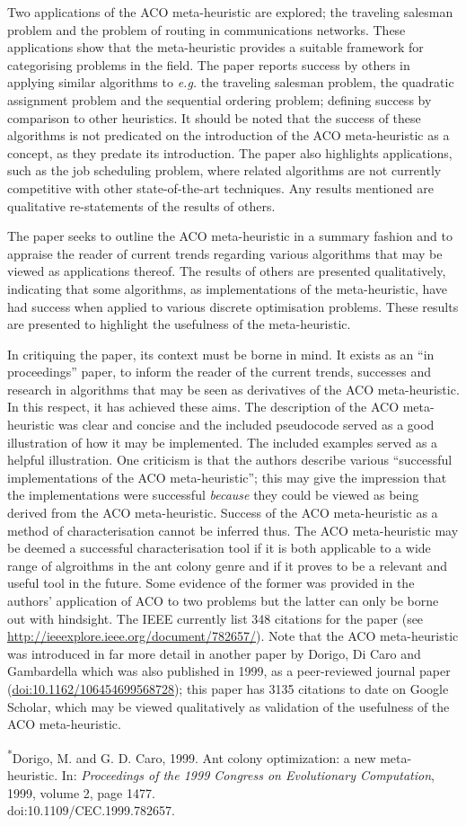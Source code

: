 \documentclass[a4paper,10pt]{report}
\begin{document}
Two applications of the ACO meta-heuristic are explored; the traveling salesman problem and the problem of routing in communications networks.  These applications show that the meta-heuristic provides a suitable framework for categorising problems in the field.  The paper reports success by others in applying similar algorithms to \emph{e.g.} the traveling salesman problem, the quadratic assignment problem and the sequential ordering problem; defining success by comparison to other heuristics.  It should be noted that the success of these algorithms is not predicated on the introduction of the ACO meta-heuristic as a concept, as they predate its introduction.  The paper also highlights applications, such as the job scheduling problem, where related algorithms are not currently competitive with other state-of-the-art techniques. Any results mentioned are qualitative re-statements of the results of others.

The paper seeks to outline the ACO meta-heuristic in a summary fashion and to appraise the reader of current trends regarding various algorithms that may be viewed as applications thereof. The results of others are presented qualitatively, indicating that some algorithms, as implementations of the meta-heuristic, have had success when applied to various discrete optimisation problems.  These results are presented to highlight the usefulness of the meta-heuristic.  

In critiquing the paper, its context must be borne in mind.  It exists as an ``in proceedings'' paper, to inform the reader of the current trends, successes and research in algorithms that may be seen as derivatives of the ACO meta-heuristic.  In this respect, it has achieved these aims. The description of the ACO meta-heuristic was clear and concise and the included pseudocode served as a good illustration of how it may be implemented. The included examples served as a helpful illustration. One criticism is that the authors describe various ``successful implementations of the ACO meta-heuristic''; this may give the impression that the implementations were successful \emph{because} they could be viewed as being derived from the ACO meta-heuristic. Success of the ACO meta-heuristic as a method of characterisation cannot be inferred thus. The ACO meta-heuristic may be deemed a successful characterisation tool if it is both applicable to a wide range of algroithms in the ant colony genre and if it proves to be a relevant and useful tool in the future.  Some evidence of the former was provided in the authors' application of ACO to two problems but the latter can only be borne out with hindsight.  The IEEE currently list 348 citations for the paper (see \url{http://ieeexplore.ieee.org/document/782657/}).  Note that the ACO meta-heuristic was introduced in far more detail in another paper by Dorigo, Di Caro and Gambardella which was also published in 1999, as a peer-reviewed journal paper (\href{https://doi.org/10.1162/106454699568728}{doi:10.1162/106454699568728}); this paper has 3135 citations to date on Google Scholar, which may be viewed qualitatively as validation of the usefulness of the ACO meta-heuristic.
	
\vspace{0.25in}
\noindent
\textsuperscript{*}Dorigo, M. and G. D. Caro, 1999. Ant colony optimization: a new meta-heuristic. In: \emph{Proceedings of the 1999 Congress on Evolutionary Computation}, 1999, volume 2, page 1477. \\doi:10.1109/CEC.1999.782657.
\end{document}
